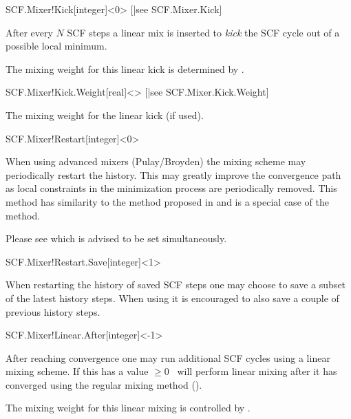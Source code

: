 \begin{fdfentry}{SCF.Mixer!Kick}[integer]<0>%
  [|see SCF.Mixer.Kick]

  After every $N$ SCF steps a linear mix is inserted to \emph{kick}
  the SCF cycle out of a possible local minimum. 

  The mixing weight for this linear kick is determined by .
  
\end{fdfentry}

\begin{fdfentry}{SCF.Mixer!Kick.Weight}[real]<>%
  [|see SCF.Mixer.Kick.Weight]

  The mixing weight for the linear kick (if used).
  
\end{fdfentry}



\begin{fdfentry}{SCF.Mixer!Restart}[integer]<0>

  When using advanced mixers (Pulay/Broyden) the mixing scheme may
  periodically restart the history. This may greatly improve the
  convergence path as local constraints in the minimization process
  are periodically removed. This method has similarity to the method
  proposed in \cite{Banerjee2016} and is a special case of the
   method.

  Please see  which is advised to be set
  simultaneously. 
  
\end{fdfentry}

\begin{fdfentry}{SCF.Mixer!Restart.Save}[integer]<1>

  When restarting the history of saved SCF steps one may choose to
  save a subset of the latest history steps.
  When using  it is encouraged to also save a
  couple of previous history steps.
  
\end{fdfentry}


\begin{fdfentry}{SCF.Mixer!Linear.After}[integer]<-1>

  After reaching convergence one may run additional SCF cycles using a
  linear mixing scheme. If this has a value $\ge 0$ \siesta\ will
  perform linear mixing after it has converged using the regular
  mixing method ().

  The mixing weight for this linear mixing is controlled by .

\end{fdfentry}



